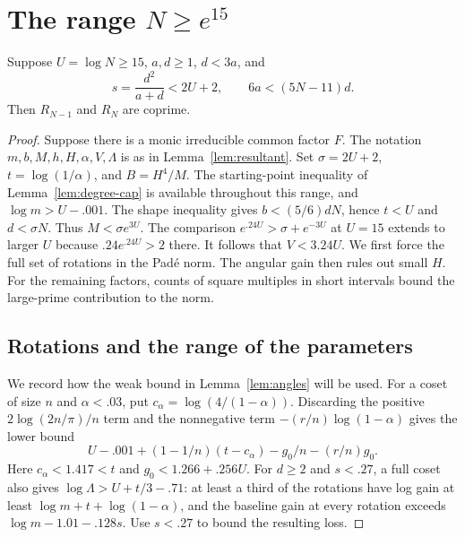\section{The range \texorpdfstring{\(N\ge e^{15}\)}{N at least exp(15)}}\label{sec:large-tail}

\begin{proposition}\label{prop:large-tail}
Suppose \(U=\log N\ge15\), \(a,d\ge1\), \(d<3a\), and
\[
  s=\frac{d^2}{a+d}<2U+2,\qquad 6a<(5N-11)d .
\]
Then \(R_{N-1}\) and \(R_N\) are coprime.
\end{proposition}

\begin{proof}
Suppose there is a monic irreducible common factor \(F\).
The notation \(m,b,M,h,H,\alpha,V,\Lambda\) is as in
Lemma~\ref{lem:resultant}. Set \(\sigma=2U+2\), \(t=\log(1/\alpha)\),
and \(B=H^4/M\). The starting-point inequality of
Lemma~\ref{lem:degree-cap} is available throughout this range,
and \(\log m>U-.001\).
The shape inequality gives \(b<(5/6)dN\), hence \(t<U\)
and \(d<\sigma N\). Thus \(M<\sigma e^{3U}\).
The comparison \(e^{.24U}>\sigma+e^{-3U}\) at \(U=15\)
extends to larger \(U\) because \(.24e^{.24U}>2\) there.
It follows that \(V<3.24U\).
We first force the full set of rotations in the Padé norm.
The angular gain then rules out small \(H\).
For the remaining factors, counts of square multiples in short
intervals bound the large-prime contribution to the norm.

\subsection*{Rotations and the range of the parameters}

We record how the weak bound in Lemma~\ref{lem:angles} will be used.
For a coset of size \(n\) and \(\alpha<.03\), put
\(c_\alpha=\log(4/(1-\alpha))\). Discarding the positive
\(2\log(2n/\pi)/n\) term and the nonnegative term
\(-(r/n)\log(1-\alpha)\) gives the lower bound
\begin{equation}\label{eq:large-angular-template}
 U-.001+(1-1/n)(t-c_\alpha)
               -g_0/n-(r/n)g_0 .
\end{equation}
Here \(c_\alpha<1.417<t\) and \(g_0<1.266+.256U\).
For \(d\ge2\) and \(s<.27\), a full coset also gives
\(\log\Lambda>U+t/3-.71\): at least a third of the rotations
have log gain at least \(\log m+t+\log(1-\alpha)\), and the
baseline gain at every rotation exceeds \(\log m-1.01-.128s\).
Use \(s<.27\) to bound the resulting loss.


\end{proof}
